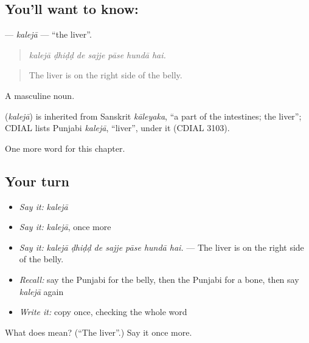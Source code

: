 \subsection*{You'll want to know: }
\textbf{} — \emph{kalejā} — \textquotedblleft{}the liver\textquotedblright{}.

\begin{quote}
      
\end{quote}

\begin{quote}
\emph{kalejā ḍhiḍḍ de sajje pāse hundā hai.}
\end{quote}

\begin{quote}
The liver is on the right side of the belly.
\end{quote}

A masculine noun.

\begin{cousinweb}
\textbf{} (\emph{kalejā}) is inherited from Sanskrit \emph{kāleyaka}, \textquotedblleft{}a part of the intestines; the liver\textquotedblright{}; CDIAL lists Punjabi \emph{kalejā}, \textquotedblleft{}liver\textquotedblright{}, under it (CDIAL 3103).
\end{cousinweb}

\begin{grammarlens}[title={What you've built}]
One more word for this chapter.
\end{grammarlens}

\subsection*{Your turn}
\begin{itemize}
\raggedright
  \item \emph{Say it:} \emph{kalejā}
  \item \emph{Say it:} \emph{kalejā}, once more
  \item \emph{Say it:} \emph{kalejā ḍhiḍḍ de sajje pāse hundā hai.} — The liver is on the right side of the belly.
  \item \emph{Recall:} say the Punjabi for the belly, then the Punjabi for a bone, then say \emph{kalejā} again
  \item \emph{Write it:} copy \textbf{} once, checking the whole word
\end{itemize}

\begin{tcolorbox}[breakable,colback=teal!4,colframe=teal!35!black,title={Before you move on}]
What does  mean? (\textquotedblleft{}The liver\textquotedblright{}.) Say it once more.
\end{tcolorbox}
